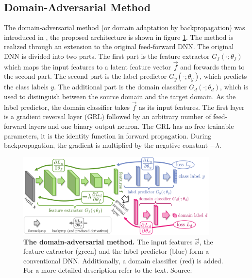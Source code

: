 \subsection{Domain-Adversarial Method}
The domain-adversarial method (or domain adaptation by backpropagation) was introduced in \cite{DA_Backprop, DA_Adversarial}, the proposed architecture is shown in figure \ref{fig:ch_4_DA_Backprop}. The method is realized through an extension to the original feed-forward DNN. The original DNN is divided into two parts. The first part is the feature extractor $G_f(\cdot;\theta_f)$ which maps the input features to a latent feature vector $\vec{f}$ and forwards them to the second part. The second part is the label predictor $G_y(\cdot;\theta_y)$, which predicts the class labels $y$. The additional part is the domain classifier $G_d(\cdot;\theta_d)$, which is used to distinguish between the source domain and the target domain. As the label predictor, the domain classifier takes $\vec{f}$ as its input features. The first layer is a gradient reversal layer (GRL) followed by an arbitrary number of feed-forward layers and one binary output neuron. The GRL has no free trainable parameters, it is the identity function in forward propagation. During backpropagation, the gradient is multiplied by the negative constant $-\lambda$.\\ 

\begin{figure}
\centering
\includegraphics[width=0.9\textwidth]{assets/gradReversal.png}
\caption[Domain-Adversarial Method]{\textbf{The domain-adversarial method.} The input features $\vec{x}$, the feature extractor (green) and the label predictor (blue) form a conventional DNN. Additionally, a domain classifier (red) is added. For a more detailed description refer to the text. Source: \cite{DA_Adversarial}}
\label{fig:ch_4_DA_Backprop}
\end{figure}

